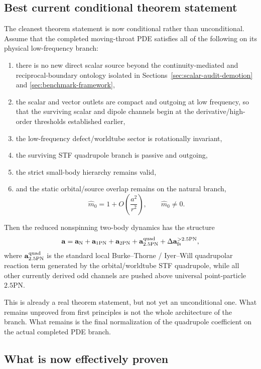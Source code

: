 \documentclass[11pt]{article}
\begin{document}
\subsection{Best current conditional theorem statement}
\label{sec:conditional-theorem-gap-statement}

The cleanest theorem statement is now conditional rather than unconditional.
Assume that the completed moving-throat PDE satisfies all of the following on
its physical low-frequency branch:
\begin{enumerate}
  \item there is no new direct scalar source beyond the continuity-mediated and
  reciprocal-boundary ontology isolated in
  Sections~\ref{sec:scalar-audit-demotion} and
  \ref{sec:benchmark-framework},
  \item the scalar and vector outlets are compact and outgoing at low
  frequency, so that the surviving scalar and dipole channels begin at the
  derivative/high-order thresholds established earlier,
  \item the low-frequency defect/worldtube sector is rotationally invariant,
  \item the surviving STF quadrupole branch is passive and outgoing,
  \item the strict small-body hierarchy remains valid,
  \item and the static orbital/source overlap remains on the natural branch,
  \[
  \hat m_0 = 1 + O\!\left(\frac{a^2}{r^2}\right),
  \qquad
  \hat m_0\neq 0.
  \]
\end{enumerate}
Then the reduced nonspinning two-body dynamics has the structure
\[
\mathbf a
=
\mathbf a_{\rm N}
+\mathbf a_{1\rm PN}
+\mathbf a_{2\rm PN}
+\mathbf a_{2.5\rm PN}^{\rm quad}
+\Delta\mathbf a_{\rm fs}^{>2.5\rm PN},
\]
where $\mathbf a_{2.5\rm PN}^{\rm quad}$ is the standard local
Burke--Thorne / Iyer--Will quadrupolar reaction term generated by the
orbital/worldtube STF quadrupole, while all other currently derived odd
channels are pushed above universal point-particle $2.5$PN.

This is already a real theorem statement, but not yet an unconditional one.
What remains unproved from first principles is not the whole architecture of the
branch.  What remains is the final normalization of the quadrupole coefficient
on the actual completed PDE branch.

\subsection{What is now effectively proven}
\label{sec:conditional-theorem-gap-proven}
\end{document}
